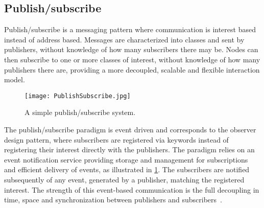 





\subsection{Publish/subscribe}

Publish/subscribe is a messaging pattern where communication is interest based instead of address based. Messages are characterized into classes and sent by publishers, without knowledge of how many subscribers there may be. Nodes can then subscribe to one or more classes of interest, without knowledge of how many publishers there are, providing a more decoupled, scalable and flexible interaction model.

\begin{figure}
	\centering
	\texttt{[image: PublishSubscribe.jpg]} 
	\caption[Distributed Computing System with 2 nodes]{
		\label{fig:publishSubscribe} 
		\footnotesize{%
			A simple publish/subscribe system.
		}
	}
\end{figure}

The publish/subscribe paradigm is event driven and corresponds to the observer design pattern, where subscribers are registered via keywords instead of registering their interest directly with the publishers. The paradigm relies on an event notification service providing storage and management for subscriptions and efficient delivery of events, as illustrated in \cref{fig:publishSubscribe}. The subscribers are notified subsequently of any event, generated by a publisher, matching the registered interest. The strength of this event-based communication is the full decoupling in time, space and synchronization between publishers and subscribers~\cite{eugster2003many}.

